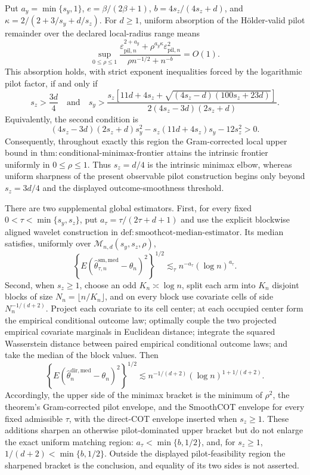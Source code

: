 Put \(a_y=\min\{s_y,1\}\), \(e=\beta/(2\beta+1)\), \(b=4s_z/(4s_z+d)\), and \(\kappa=2/(2+3/s_y+d/s_z)\). For \(d\ge1\), uniform absorption of the H\"older-valid pilot remainder over the declared local-radius range means
\[
\sup_{0\le\rho\le1}
\frac{\varepsilon_{\mathrm{pil},n}^{2+a_y}+\rho^{a_y\kappa}\varepsilon_{\mathrm{pil},n}^2}
{\rho n^{-1/2}+n^{-b}}=O(1).
\]
This absorption holds, with strict exponent inequalities forced by the logarithmic pilot factor, if and only if
\[
s_z>\frac{3d}{4}
\quad\text{and}\quad
s_y>
\frac{s_z\!\left[11d+4s_z+\sqrt{(4s_z-d)(100s_z+23d)}\right]}
{2(4s_z-3d)(2s_z+d)}.
\]
Equivalently, the second condition is
\[
(4s_z-3d)(2s_z+d)s_y^2-s_z(11d+4s_z)s_y-12s_z^2>0.
\]
Consequently, throughout exactly this region the Gram-corrected local upper bound in \(\mathrm{thm{:}conditional\text{-}minimax\text{-}frontier}\) attains the intrinsic frontier uniformly in \(0\le\rho\le1\). Thus \(s_z=d/4\) is the intrinsic minimax elbow, whereas uniform sharpness of the present observable pilot construction begins only beyond \(s_z=3d/4\) and the displayed outcome-smoothness threshold.

There are two supplemental global estimators. First, for every fixed \(0<\tau<\min\{s_y,s_z\}\), put \(a_\tau=\tau/(2\tau+d+1)\) and use the explicit blockwise aligned wavelet construction in \(\mathrm{def{:}smoothcot\text{-}median\text{-}estimator}\). Its median satisfies, uniformly over \(\mathcal M_{n,d}(s_y,s_z,\rho)\),
\[
\left\{E(\widehat\theta^{\mathrm{sm,med}}_{\tau,n}-\theta_n)^2\right\}^{1/2}
\lesssim_\tau n^{-a_\tau}(\log n)^{a_\tau}.
\]
Second, when \(s_z\ge1\), choose an odd \(K_n\asymp\log n\), split each arm into \(K_n\) disjoint blocks of size \(N_n=\lfloor n/K_n\rfloor\), and on every block use covariate cells of side \(N_n^{-1/(d+2)}\). Project each covariate to its cell center; at each occupied center form the empirical conditional outcome law; optimally couple the two projected empirical covariate marginals in Euclidean distance; integrate the squared Wasserstein distance between paired empirical conditional outcome laws; and take the median of the block values. Then
\[
\left\{E(\widehat\theta_n^{\mathrm{dir,med}}-\theta_n)^2\right\}^{1/2}
\lesssim n^{-1/(d+2)}(\log n)^{1+1/(d+2)}.
\]
Accordingly, the upper side of the minimax bracket is the minimum of \(\rho^2\), the theorem's Gram-corrected pilot envelope, and the SmoothCOT envelope for every fixed admissible \(\tau\), with the direct-COT envelope inserted when \(s_z\ge1\). These additions sharpen an otherwise pilot-dominated upper bracket but do not enlarge the exact uniform matching region: \(a_\tau<\min\{b,1/2\}\), and, for \(s_z\ge1\), \(1/(d+2)<\min\{b,1/2\}\). Outside the displayed pilot-feasibility region the sharpened bracket is the conclusion, and equality of its two sides is not asserted.